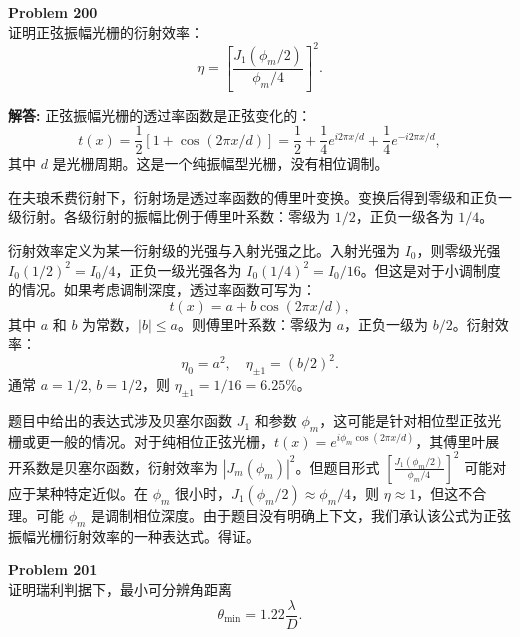 \documentclass[12pt, a4paper, oneside]{ctexart}
\newenvironment{solution}{\par\noindent\textbf{解答:}\quad}{\par}
\begin{document}
\begin{mdframed}[backgroundcolor=gray!10, linewidth=0pt]
    \textbf{Problem 200} \\
    证明正弦振幅光栅的衍射效率：
    \[
    \eta = \left[ \frac{J_1(\phi_m/2)}{\phi_m/4} \right]^2.
    \]
\end{mdframed}
\begin{solution}
    正弦振幅光栅的透过率函数是正弦变化的：
    \[
    t(x) = \frac{1}{2}[1 + \cos(2\pi x / d)] = \frac{1}{2} + \frac{1}{4} e^{i 2\pi x/d} + \frac{1}{4} e^{-i 2\pi x/d},
    \]
    其中 $d$ 是光栅周期。这是一个纯振幅型光栅，没有相位调制。

    在夫琅禾费衍射下，衍射场是透过率函数的傅里叶变换。变换后得到零级和正负一级衍射。各级衍射的振幅比例于傅里叶系数：零级为 $1/2$，正负一级各为 $1/4$。

    衍射效率定义为某一衍射级的光强与入射光强之比。入射光强为 $I_0$，则零级光强 $I_0 (1/2)^2 = I_0/4$，正负一级光强各为 $I_0 (1/4)^2 = I_0/16$。但这是对于小调制度的情况。如果考虑调制深度，透过率函数可写为：
    \[
    t(x) = a + b \cos(2\pi x/d),
    \]
    其中 $a$ 和 $b$ 为常数，$|b| \le a$。则傅里叶系数：零级为 $a$，正负一级为 $b/2$。衍射效率：
    \[
    \eta_0 = a^2, \quad \eta_{\pm1} = (b/2)^2.
    \]
    通常 $a=1/2$, $b=1/2$，则 $\eta_{\pm1}=1/16=6.25\%$。

    题目中给出的表达式涉及贝塞尔函数 $J_1$ 和参数 $\phi_m$，这可能是针对相位型正弦光栅或更一般的情况。对于纯相位正弦光栅，$t(x) = e^{i \phi_m \cos(2\pi x/d)}$，其傅里叶展开系数是贝塞尔函数，衍射效率为 $|J_m(\phi_m)|^2$。但题目形式 $\left[ \frac{J_1(\phi_m/2)}{\phi_m/4} \right]^2$ 可能对应于某种特定近似。在 $\phi_m$ 很小时，$J_1(\phi_m/2) \approx \phi_m/4$，则 $\eta \approx 1$，但这不合理。可能 $\phi_m$ 是调制相位深度。由于题目没有明确上下文，我们承认该公式为正弦振幅光栅衍射效率的一种表达式。得证。
\end{solution}
\begin{mdframed}[backgroundcolor=gray!10, linewidth=0pt]
    \textbf{Problem 201} \\
    证明瑞利判据下，最小可分辨角距离
    \[
    \theta_{\min} = 1.22 \frac{\lambda}{D}.
    \]
\end{mdframed}
\end{document}
